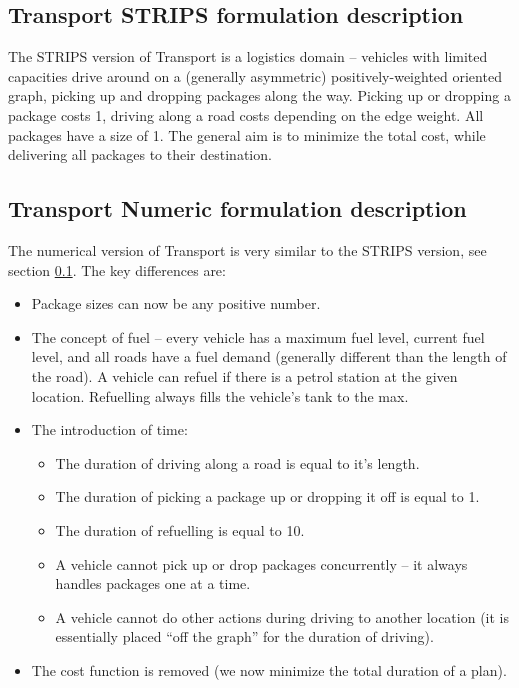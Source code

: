 \documentclass[10pt,a4paper,oneside]{article}
\begin{document}
\subsection{Transport STRIPS formulation description}\label{transport-strips}

The STRIPS version of Transport is a logistics domain -- vehicles with limited capacities drive around on a (generally asymmetric) positively-weighted oriented graph, picking up and dropping packages along the way. Picking up or dropping a package costs 1, driving along a road costs depending on the edge weight. All packages have a size of 1. The general aim is to minimize the total cost, while delivering all packages to their destination.

\subsection{Transport Numeric formulation description}\label{transport-numeric}

The numerical version of Transport is very similar to the STRIPS version, see section \ref{transport-strips}. The key differences are:
\begin{itemize}
\item Package sizes can now be any positive number.
\item The concept of fuel -- every vehicle has a maximum fuel level, current fuel level, and all roads have a fuel demand (generally different than the length of the road). A vehicle can refuel if there is a petrol station at the given location. Refuelling always fills the vehicle's tank to the max.
\item The introduction of time:
\begin{itemize}
\item The duration of driving along a road is equal to it's length.
\item The duration of picking a package up or dropping it off is equal to 1.
\item The duration of refuelling is equal to 10.
\item A vehicle cannot pick up or drop packages concurrently -- it always handles packages one at a time.
\item A vehicle cannot do other actions during driving to another location (it is essentially placed ``off the graph'' for the duration of driving).
\end{itemize}
\item The cost function is removed (we now minimize the total duration of a plan).
\end{itemize}
\end{document}
